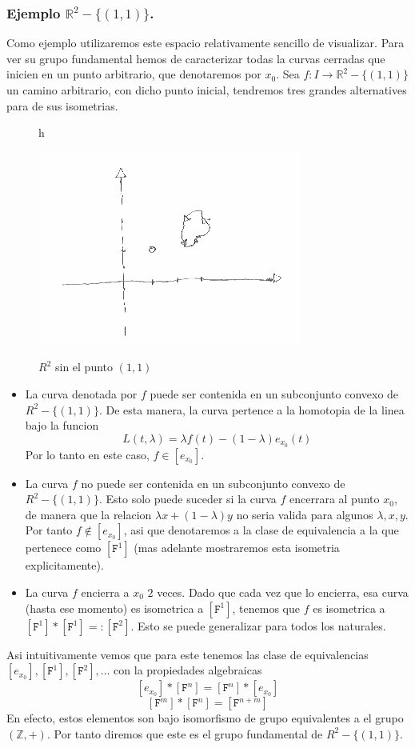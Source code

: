 \subsubsection{Ejemplo \(\mathbb{R}^2 - \{(1,1)\}\).}
Como ejemplo utilizaremos este espacio relativamente sencillo de
visualizar. Para ver su grupo fundamental hemos de caracterizar todas la
curvas cerradas que inicien en un punto arbitrario, que denotaremos por
\(x_0\). Sea \(f : I \to \mathbb{R}^2 - \{(1,1)\}\) un camino
arbitrario, con dicho punto inicial, tendremos tres grandes alternatives
para de sus isometrias.
\begin{figure}{h}
  \caption{\(R^2\) sin el punto \((1,1)\)}
  \centering
  \includegraphics[scale=0.5]{./imagenes/R2-sin-un-punto.png}
  \label{fig:R2-sin-punto}
\end{figure}
\begin{itemize}
\item La curva denotada por \(f\) puede ser contenida en un subconjunto
  convexo de \(R^2 - \{(1,1)\}\). De esta manera, la curva pertence a la
  homotopia de la linea bajo la funcion
  \[ L (t,\lambda) = \lambda f (t) - (1 - \lambda) e_{x_0} (t)\]
  Por lo tanto en este caso, \(f \in [e_{x_0}]\).
\item La curva \(f\) no puede ser contenida en un subconjunto convexo de
  \(R^2 - \{ (1,1)\}\). Esto solo puede suceder si la curva \(f\)
  encerrara al punto \(x_0\), de manera que la relacion \(\lambda x +
  (1 - \lambda) y\) no seria valida para algunos \(\lambda, x, y\). Por
  tanto \(f \not \in [e_{x_0}]\), asi que denotaremos a la clase de
  equivalencia a la que pertenece como \([\mathtt{F}^1]\) (mas adelante
  mostraremos esta isometria explicitamente).
\item La curva \(f\) encierra a \(x_0\) \(2\) veces. Dado que cada vez
  que lo encierra, esa curva (hasta ese momento) es isometrica a
  \([\mathtt F ^1]\), tenemos que \(f\) es isometrica a \( [\mathtt F
  ^1] * [\mathtt F ^1] =: [\mathtt F ^2]\). Esto se puede generalizar
  para todos los naturales.
\end{itemize}
Asi intuitivamente vemos que para este tenemos las clase de
equivalencias \([e_{x_0}], [\mathtt F ^1], [\mathtt F ^2], \dots \) con
la propiedades algebraicas
\[ [e_{x_0}] * [\mathtt F ^n] = [\mathtt F ^n] * [e_{x_0}]\]
\[ [\mathtt F ^m]  * [\mathtt F ^n] = [\mathtt F ^{n + m}]\]
En efecto, estos elementos son bajo isomorfismo de grupo equivalentes a
el grupo \((\mathbb{Z}, +)\). Por tanto diremos que este es el grupo
fundamental de \(R^2 - \{(1,1)\}\).


